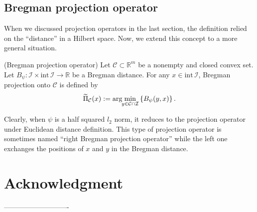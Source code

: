 \documentclass{svjour3}                %
\def \R {{\mathbb{R}}}
\def \I {{\mathcal{I}}}
\def \C {{\mathcal{C}}}
\def\argmin{\arg\hspace{-1mm}\min}
\newcommand{\inter}[1]{\mathrm{int}\,{#1}} %
\begin{document}
\subsection{Bregman projection operator}
When we discussed projection operators in the last section, the definition relied on the ``distance'' in a Hilbert space. Now, we extend this concept to a more general situation.
\begin{definition}
(Bregman projection operator) Let $\C\subset \R^m$ be a nonempty and closed convex set. Let $B_{\psi}:\I \times \inter \I \rightarrow \R$ be a Bregman distance. For any $x\in \inter \I$, Bregman projection onto $\C$ is defined by
\begin{equation*}
\widetilde{\Pi}_\C (x):= \argmin_{y\in \C\cap \I}\left\{ B_{\psi} (y,x) \right\}.
\end{equation*}
\end{definition}
Clearly, when $\psi$ is a half squared $l_2$ norm, it reduces to the projection operator under Euclidean distance definition. This type of projection operator is sometimes named ``right Bregman projection operator'' while the left one exchanges the positions of $x$ and $y$ in the Bregman distance.
	

\section*{Acknowledgment}
----------------------------


%
%
\end{document}
